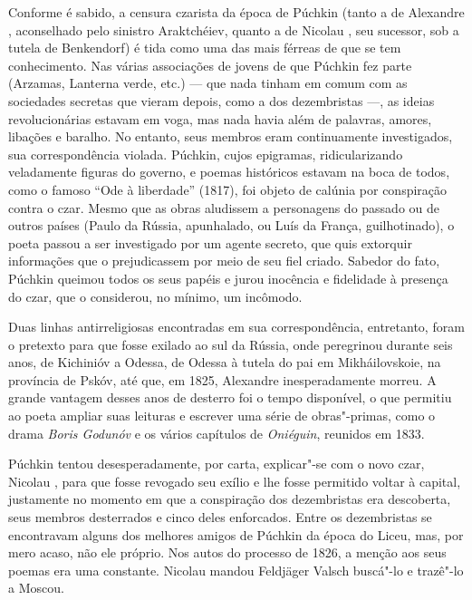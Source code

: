 Conforme é sabido, a censura czarista da época de Púchkin (tanto a de
Alexandre , aconselhado pelo sinistro Araktchéiev, quanto a de Nicolau , seu sucessor, sob a tutela de Benkendorf) é tida como uma das mais férreas de que se tem conhecimento. Nas várias associações de jovens de que Púchkin fez parte (Arzamas, Lanterna verde, etc.) --- que nada tinham em
comum com as sociedades secretas que vieram depois, como a dos dezembristas ---, as ideias revolucionárias estavam em voga, mas nada havia além de palavras, amores, libações e baralho. No entanto, seus membros eram continuamente investigados, sua correspondência violada. Púchkin, cujos epigramas, ridicularizando veladamente figuras do governo, e poemas históricos estavam na boca de todos, como o famoso ``Ode à liberdade'' (1817), foi objeto de calúnia por conspiração contra o czar. Mesmo que as obras aludissem a
personagens do passado ou de outros países (Paulo  da Rússia,
apunhalado, ou Luís  da França, guilhotinado), o poeta passou a ser investigado por um agente secreto, que quis extorquir informações que o
prejudicassem por meio de seu fiel criado. Sabedor do fato, Púchkin queimou todos os seus papéis e jurou inocência e fidelidade à presença do czar, que o considerou, no mínimo, um incômodo.

Duas linhas antirreligiosas encontradas em sua correspondência,
entretanto, foram o pretexto para que fosse exilado ao sul da Rússia,
onde peregrinou durante seis anos, de Kichinióv a
Odessa, de Odessa à tutela do pai em Mikháilovskoie, na província de
Pskóv, até que, em 1825, Alexandre  inesperadamente morreu. A grande
vantagem desses anos de desterro foi o tempo disponível, o que permitiu ao
poeta ampliar suas leituras e escrever uma série de obras"-primas, como o
drama \emph{Boris Godunóv} e os vários capítulos de
\emph{Oniéguin}, reunidos em 1833.

Púchkin tentou desesperadamente, por carta, explicar"-se com o novo czar,
Nicolau , para que fosse revogado seu exílio e lhe fosse permitido
voltar à capital, justamente no momento em que a conspiração dos dezembristas era descoberta, seus membros desterrados e cinco deles enforcados. Entre os dezembristas se encontravam alguns dos melhores amigos de Púchkin da época do Liceu, mas, por mero acaso, não ele próprio. Nos autos do processo de 1826, a
menção aos seus poemas era uma constante. Nicolau mandou Feldjäger Valsch buscá"-lo e trazê"-lo a Moscou.

